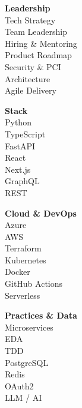 \vspace{0.2cm}


\begin{minipage}[t]{0.24\textwidth}
    \Large
    \vspace{-\baselineskip}
    \textbf{Leadership}\\[2pt]
    \faCircle \; {Tech Strategy}\\
    \faCircle \; {Team Leadership}\\
    \faCircle \; {Hiring \& Mentoring}\\
    \faCircle \; {Product Roadmap}\\
    \faCircle \; {Security \& PCI}\\
    \faCircle \; {Architecture}\\
    \faCircle \; {Agile Delivery}\\
\end{minipage}
\begin{minipage}[t]{0.25\textwidth}
    \Large
    \vspace{-\baselineskip}
    \textbf{Stack}\\[2pt]
    \faCircle \; {Python}\\
    \faCircle \; {TypeScript}\\
    \faCircle \; {FastAPI}\\
    \faCircle \; {React}\\
    \faCircle \; {Next.js}\\
    \faCircle \; {GraphQL}\\
    \faCircle \; {REST}\\
\end{minipage}
\begin{minipage}[t]{0.25\textwidth}
    \Large
    \vspace{-\baselineskip}
    \textbf{Cloud \& DevOps}\\[2pt]
    \faCircle \; {Azure}\\
    \faCircle \; {AWS}\\
    \faCircle \; {Terraform}\\
    \faCircle \; {Kubernetes}\\
    \faCircle \; {Docker}\\
    \faCircle \; {GitHub Actions}\\
    \faCircle \; {Serverless}\\
\end{minipage}
\begin{minipage}[t]{0.25\textwidth}
    \Large
    \vspace{-\baselineskip}
    \textbf{Practices \& Data}\\[2pt]
    \faCircle \; {Microservices}\\
    \faCircle \; {EDA}\\
    \faCircle \; {TDD}\\
    \faCircle \; {PostgreSQL}\\
    \faCircle \; {Redis}\\
    \faCircle \; {OAuth2}\\
    \faCircle \; {LLM / AI}\\
\end{minipage}